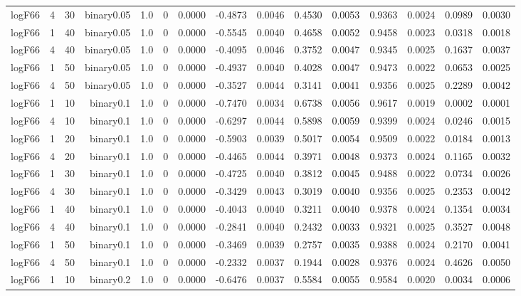 \begin{longtable}{rrrrrrrrrrrrrrr}
  logF66 & 4 & 30 & binary0.05 & 1.0 & 0 & 0.0000 & -0.4873 & 0.0046 & 0.4530 & 0.0053 & 0.9363 & 0.0024 & 0.0989 & 0.0030 \\ 
  logF66 & 1 & 40 & binary0.05 & 1.0 & 0 & 0.0000 & -0.5545 & 0.0040 & 0.4658 & 0.0052 & 0.9458 & 0.0023 & 0.0318 & 0.0018 \\ 
  logF66 & 4 & 40 & binary0.05 & 1.0 & 0 & 0.0000 & -0.4095 & 0.0046 & 0.3752 & 0.0047 & 0.9345 & 0.0025 & 0.1637 & 0.0037 \\ 
  logF66 & 1 & 50 & binary0.05 & 1.0 & 0 & 0.0000 & -0.4937 & 0.0040 & 0.4028 & 0.0047 & 0.9473 & 0.0022 & 0.0653 & 0.0025 \\ 
  logF66 & 4 & 50 & binary0.05 & 1.0 & 0 & 0.0000 & -0.3527 & 0.0044 & 0.3141 & 0.0041 & 0.9356 & 0.0025 & 0.2289 & 0.0042 \\ 
  logF66 & 1 & 10 & binary0.1 & 1.0 & 0 & 0.0000 & -0.7470 & 0.0034 & 0.6738 & 0.0056 & 0.9617 & 0.0019 & 0.0002 & 0.0001 \\ 
  logF66 & 4 & 10 & binary0.1 & 1.0 & 0 & 0.0000 & -0.6297 & 0.0044 & 0.5898 & 0.0059 & 0.9399 & 0.0024 & 0.0246 & 0.0015 \\ 
  logF66 & 1 & 20 & binary0.1 & 1.0 & 0 & 0.0000 & -0.5903 & 0.0039 & 0.5017 & 0.0054 & 0.9509 & 0.0022 & 0.0184 & 0.0013 \\ 
  logF66 & 4 & 20 & binary0.1 & 1.0 & 0 & 0.0000 & -0.4465 & 0.0044 & 0.3971 & 0.0048 & 0.9373 & 0.0024 & 0.1165 & 0.0032 \\ 
  logF66 & 1 & 30 & binary0.1 & 1.0 & 0 & 0.0000 & -0.4725 & 0.0040 & 0.3812 & 0.0045 & 0.9488 & 0.0022 & 0.0734 & 0.0026 \\ 
  logF66 & 4 & 30 & binary0.1 & 1.0 & 0 & 0.0000 & -0.3429 & 0.0043 & 0.3019 & 0.0040 & 0.9356 & 0.0025 & 0.2353 & 0.0042 \\ 
  logF66 & 1 & 40 & binary0.1 & 1.0 & 0 & 0.0000 & -0.4043 & 0.0040 & 0.3211 & 0.0040 & 0.9378 & 0.0024 & 0.1354 & 0.0034 \\ 
  logF66 & 4 & 40 & binary0.1 & 1.0 & 0 & 0.0000 & -0.2841 & 0.0040 & 0.2432 & 0.0033 & 0.9321 & 0.0025 & 0.3527 & 0.0048 \\ 
  logF66 & 1 & 50 & binary0.1 & 1.0 & 0 & 0.0000 & -0.3469 & 0.0039 & 0.2757 & 0.0035 & 0.9388 & 0.0024 & 0.2170 & 0.0041 \\ 
  logF66 & 4 & 50 & binary0.1 & 1.0 & 0 & 0.0000 & -0.2332 & 0.0037 & 0.1944 & 0.0028 & 0.9376 & 0.0024 & 0.4626 & 0.0050 \\ 
  logF66 & 1 & 10 & binary0.2 & 1.0 & 0 & 0.0000 & -0.6476 & 0.0037 & 0.5584 & 0.0055 & 0.9584 & 0.0020 & 0.0034 & 0.0006 \\ 

\end{longtable}
